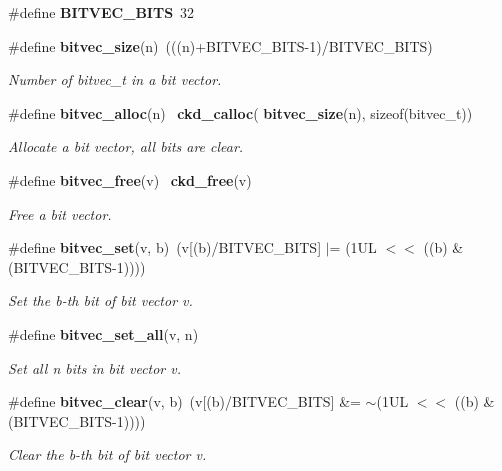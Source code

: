 \begin{DoxyCompactItemize}
\item 
\mbox{\label{bitvec_8h_aa992f8d4c7dbe0b71bfd1e01ce279167}} 
\#define {\bfseries B\+I\+T\+V\+E\+C\+\_\+\+B\+I\+TS}~32
\item 
\mbox{\label{bitvec_8h_a1d82193826583f234a71cba32267d3f3}} 
\#define \textbf{ bitvec\+\_\+size}(n)~(((n)+B\+I\+T\+V\+E\+C\+\_\+\+B\+I\+TS-\/1)/B\+I\+T\+V\+E\+C\+\_\+\+B\+I\+TS)
\begin{DoxyCompactList}\small\item\em Number of bitvec\+\_\+t in a bit vector. \end{DoxyCompactList}\item 
\mbox{\label{bitvec_8h_a866043a7ac23e137f6c2f2466f4abc70}} 
\#define \textbf{ bitvec\+\_\+alloc}(n)~\textbf{ ckd\+\_\+calloc}(\textbf{ bitvec\+\_\+size}(n), sizeof(bitvec\+\_\+t))
\begin{DoxyCompactList}\small\item\em Allocate a bit vector, all bits are clear. \end{DoxyCompactList}\item 
\mbox{\label{bitvec_8h_a5628e35c88ac7e91b99dce916758824a}} 
\#define \textbf{ bitvec\+\_\+free}(v)~\textbf{ ckd\+\_\+free}(v)
\begin{DoxyCompactList}\small\item\em Free a bit vector. \end{DoxyCompactList}\item 
\#define \textbf{ bitvec\+\_\+set}(v,  b)~(v[(b)/B\+I\+T\+V\+E\+C\+\_\+\+B\+I\+TS] $\vert$= (1\+U\+L $<$$<$ ((b) \& (\+B\+I\+T\+V\+E\+C\+\_\+\+B\+I\+T\+S-\/1))))
\begin{DoxyCompactList}\small\item\em Set the b-\/th bit of bit vector v. \end{DoxyCompactList}\item 
\#define \textbf{ bitvec\+\_\+set\+\_\+all}(v,  n)
\begin{DoxyCompactList}\small\item\em Set all n bits in bit vector v. \end{DoxyCompactList}\item 
\#define \textbf{ bitvec\+\_\+clear}(v,  b)~(v[(b)/B\+I\+T\+V\+E\+C\+\_\+\+B\+I\+TS] \&= $\sim$(1\+U\+L $<$$<$ ((b) \& (\+B\+I\+T\+V\+E\+C\+\_\+\+B\+I\+T\+S-\/1))))
\begin{DoxyCompactList}\small\item\em Clear the b-\/th bit of bit vector v. \end{DoxyCompactList}\item 

\end{DoxyCompactItemize}
